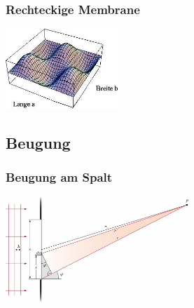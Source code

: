 \subsubsection{Rechteckige Membrane}

\begin{center}
	\begin{minipage}{0.25\textwidth}
	\end{minipage}%
	\begin{minipage}{0.25\textwidth}
		\includegraphics[height=3cm,keepaspectratio=true]{Images/rechteckige_membrane.png}
	\end{minipage}
\end{center}






\subsection{Beugung}
\subsubsection{Beugung am Spalt}

\begin{center}
	\begin{minipage}{0.2\textwidth}
	\end{minipage}%
	\begin{minipage}{0.3\textwidth}
		\includegraphics[height=4cm,right,keepaspectratio=true]{Images/beugung_am_spalt.png}
	\end{minipage}
\end{center}
